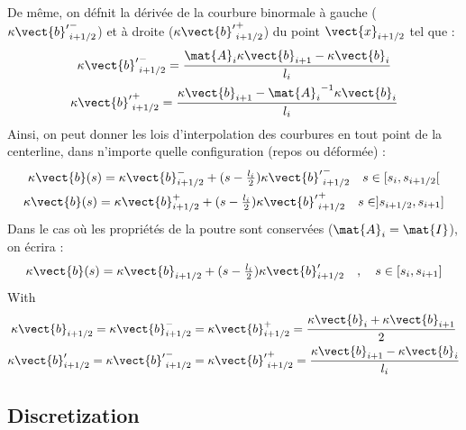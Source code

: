 De même, on défnit la dérivée de la courbure binormale à gauche (${\kappa\vect{b}'}^{-}_{i+1/2}$) et à droite (${\kappa\vect{b}'}^{+}_{i+1/2}$) du point $\vect{x}_{i+1/2}$ tel que :
\begin{subequations}
	\begin{gather}
		{\kappa\vect{b}'}^{-}_{i+1/2} = \frac{\mat{A}_i\kappa\vect{b}_{i+1} - \kappa\vect{b}_{i}}{l_i} \\
		{\kappa\vect{b}'}^{+}_{i+1/2} = \frac{\kappa\vect{b}_{i+1} - {\mat{A}_i}^{-1}\kappa\vect{b}_{i}}{l_i}
	\end{gather}
\end{subequations}
Ainsi, on peut donner les lois d'interpolation des courbures en tout point de la centerline, dans n'importe quelle configuration (repos ou déformée) :
\begin{subequations}
	\begin{gather}
		\kappa\vect{b}(s) = \kappa\vect{b}_{i+1/2}^- + (s-\tfrac{l_i}{2}) {\kappa\vect{b}'}^{-}_{i+1/2}
		\quad s \in [s_i,s_{i+1/2}[ \\
		\kappa\vect{b}(s) = \kappa\vect{b}_{i+1/2}^+ + (s-\tfrac{l_i}{2}) {\kappa\vect{b}'}^{+}_{i+1/2}
		\quad s \in ]s_{i+1/2}, s_{i+1}]
	\end{gather}
\end{subequations}
Dans le cas où les propriétés de la poutre sont conservées ($\mat{A}_i = \mat{I}$), on écrira :
\begin{equation}
	\kappa\vect{b}(s) = \kappa\vect{b}_{i+1/2} + (s-\tfrac{l_i}{2}) \kappa\vect{b}'_{i+1/2} \quad , \quad s \in [s_i,s_{i+1}]
\end{equation}
With
\begin{subequations}
	\begin{gather}
		\kappa\vect{b}_{i+1/2} = \kappa\vect{b}_{i+1/2}^- = \kappa\vect{b}_{i+1/2}^+ =
		\frac{\kappa\vect{b}_{i} + \kappa\vect{b}_{i+1}}{2} \\
		\kappa\vect{b}'_{i+1/2} = {\kappa\vect{b}'}_{i+1/2}^- = {\kappa\vect{b}'}_{i+1/2}^+ =
		\frac{\kappa\vect{b}_{i+1} - \kappa\vect{b}_{i}}{l_i}
	\end{gather}
\end{subequations}


\subsection{Discretization}

